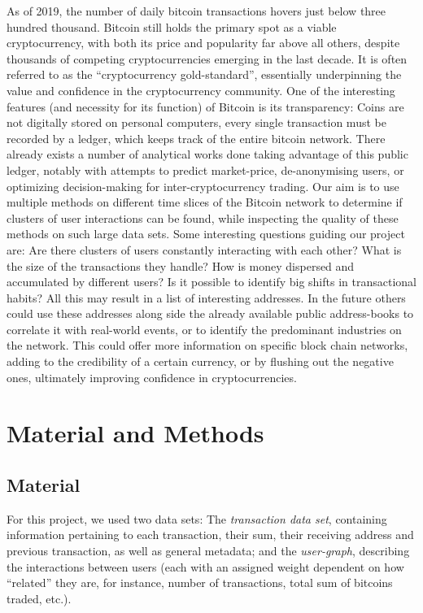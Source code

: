 \documentclass{article}
\begin{document}
As of 2019, the number of daily bitcoin transactions hovers just below three hundred
thousand. Bitcoin still holds the primary spot as a viable cryptocurrency, with both
its price and popularity far above all others, despite thousands of competing
cryptocurrencies emerging in the last decade. It is often referred to as the
``cryptocurrency gold-standard'', essentially underpinning the value and confidence
in the cryptocurrency community. One of the interesting features (and necessity for
its function) of Bitcoin is its transparency: Coins are not digitally stored on
personal computers, every single transaction must be recorded by a ledger,
which keeps track of the entire bitcoin network. There already exists a
number of analytical works done taking advantage of this public ledger, notably
with attempts to predict market-price\cite{predict}, de-anonymising users\cite{anonymity},
or optimizing decision-making for inter-cryptocurrency trading\cite{inter}. Our aim is to
use multiple methods on different time slices of the Bitcoin network to determine if
clusters of user interactions can be found, while inspecting the quality of these methods
on such large data sets. Some interesting questions guiding our project are:
Are there clusters of users constantly interacting with each other? What is the size of
the transactions they handle? How is money dispersed and accumulated by different users? 
Is it possible to identify big shifts in transactional habits? All this may result in a 
list of interesting addresses. In the future others could use these addresses along side 
the already available public address-books to correlate it with real-world events, or to 
identify the predominant industries on the network. This could offer more information on 
specific block chain networks, adding to the credibility of a certain currency, or by 
flushing out the negative ones, ultimately improving confidence in cryptocurrencies.

\section{Material and Methods}
\subsection{Material}
For this project, we used two data sets: The \textit{transaction data set}, containing
information pertaining to each transaction, their sum, their receiving address and 
previous transaction, as well as general metadata; and the \textit{user-graph}, 
describing the interactions between users (each with an assigned weight dependent on 
how ``related'' they are, for instance, number of transactions, total sum of bitcoins traded, etc.).
\end{document}
